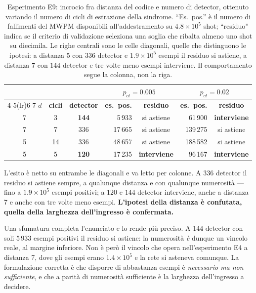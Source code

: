 \begin{table}[H]
\centering
\small
\begin{tabular}{ccc rc rc}
\toprule
& & & \multicolumn{2}{c}{$p_{ct} = 0.005$} & \multicolumn{2}{c}{$p_{ct} = 0.02$} \\
\cmidrule(lr){4-5}\cmidrule(lr){6-7}
$d$ & \textbf{cicli} & \textbf{detector} & \textbf{es.\ pos.} & \textbf{residuo} & \textbf{es.\ pos.} & \textbf{residuo} \\
\midrule
7 & \phantom{0}3 & \textbf{144} & \phantom{00}5\,933 & si astiene & \phantom{0}61\,900 & \textbf{interviene} \\
7 & \phantom{0}7 & 336 & \phantom{0}17\,665 & si astiene & 139\,275 & si astiene \\
5 & 14 & 336 & \phantom{0}48\,657 & si astiene & 188\,582 & si astiene \\
5 & \phantom{0}5 & \textbf{120} & \phantom{0}17\,235 & \textbf{interviene} & \phantom{0}96\,167 & \textbf{interviene} \\
\bottomrule
\end{tabular}
\caption[Larghezza dell'ingresso contro distanza del codice]{Esperimento E9: incrocio fra distanza del codice e numero di detector, ottenuto variando il numero di cicli di estrazione della sindrome. ``Es.\ pos.'' è il numero di fallimenti del \ac{MWPM} disponibili all'addestramento su $4.8\times10^5$ shot; ``residuo'' indica se il criterio di validazione seleziona una soglia che ribalta almeno uno shot su diecimila. Le righe centrali sono le celle diagonali, quelle che distinguono le ipotesi: a distanza 5 con $336$ detector e $1.9\times10^5$ esempi il residuo si astiene, a distanza 7 con $144$ detector e tre volte meno esempi interviene. Il comportamento segue la colonna, non la riga.}
\label{tab:neural_esempi}
\end{table}

L'esito è netto su entrambe le diagonali e va letto per colonne. A $336$ detector il residuo si astiene sempre, a qualunque distanza e con qualunque numerosità --- fino a $1.9\times10^5$ esempi positivi; a $120$ e $144$ detector interviene, anche a distanza 7 e anche con tre volte meno esempi. \textbf{L'ipotesi della distanza è confutata, quella della larghezza dell'ingresso è confermata.}

Una sfumatura completa l'enunciato e lo rende più preciso. A $144$ detector con soli $5\,933$ esempi positivi il residuo si astiene: la numerosità \emph{è} dunque un vincolo reale, al margine inferiore. Non è però il vincolo che opera nell'esperimento E4 a distanza 7, dove gli esempi erano $1.4\times10^5$ e la rete si asteneva comunque. La formulazione corretta è che disporre di abbastanza esempi è \emph{necessario ma non sufficiente}, e che a parità di numerosità sufficiente è la larghezza dell'ingresso a decidere.

